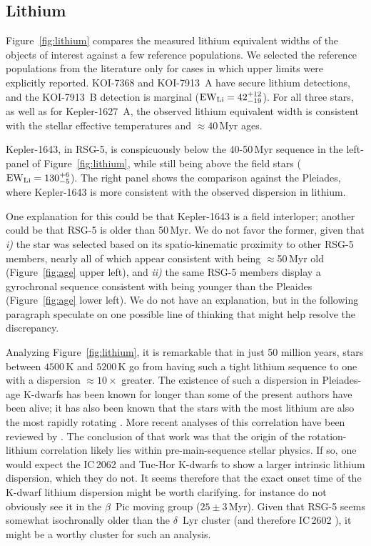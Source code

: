 \documentclass[12pt,twocolumn,linenumbers]{aastex63}
\begin{document}
\subsection{Lithium}

Figure~\ref{fig:lithium} compares the measured lithium equivalent
widths of the objects of interest against a few reference populations.
We selected the reference populations from the literature only for
cases in which upper limits were explicitly reported.  KOI-7368 and
KOI-7913~A have secure lithium detections, and the KOI-7913~B
detection is marginal (${\rm EW}_{\rm Li} = 42^{+12}_{-19}$).  For all
three stars, as well as for Kepler-1627~A, the observed lithium
equivalent width is consistent with the stellar effective temperatures
and $\approx40$\,Myr ages.

Kepler-1643, in RSG-5, is conspicuously below the 40-50$\,$Myr sequence
in the left-panel of Figure~\ref{fig:lithium}, while still being above
the field stars (${\rm EW}_{\rm Li} = 130^{+6}_{-5}$).
The right panel shows the comparison against the Pleiades, where
Kepler-1643 is more consistent with the observed dispersion in lithium.

One explanation for this could be that Kepler-1643 is a field
interloper; another could be that RSG-5 is older than 50\,Myr.  We do
not favor the former, given that {\it i)} the star was selected based
on its spatio-kinematic proximity to other RSG-5 members, nearly all
of which appear consistent with being $\approx$50\,Myr old
(Figure~\ref{fig:age} upper left), and {\it ii)} the same RSG-5
members display a gyrochronal sequence consistent with being younger
than the Pleaides (Figure~\ref{fig:age} lower left).
We do not have an explanation, but in the following paragraph
speculate on one possible line of thinking that might help resolve the
discrepancy.

Analyzing Figure~\ref{fig:lithium}, it is remarkable that in just 50
million years, stars between $4500$\,K and $5200$\,K go from having
such a tight lithium sequence to one with a dispersion
$\approx10\times$ greater.  The existence of such a dispersion in
Pleiades-age K-dwarfs has been known for longer than some of the
present authors have been alive; it has also been known that the stars
with the most lithium are also the most rapidly rotating
\citep{butler_pleiades_1987,soderblom_evolution_1993}.  More recent
analyses of this correlation have been reviewed by
\citet{bouvier_lithium-rotation_2020}.  The conclusion of that work
was that the origin of the rotation-lithium correlation likely lies
within pre-main-sequence stellar physics.  If so, one would expect the
IC\,2062 and Tuc-Hor K-dwarfs to show a larger intrinsic lithium
dispersion, which they do not.  It seems therefore that the exact
onset time of the K-dwarf lithium dispersion might be worth
clarifying.  \citet{messina_rotation-lithium_2016} for instance do not
obviously see it in the $\beta$~Pic moving group ($25\pm3$\,Myr).
Given that RSG-5 seems somewhat isochronally older than the
$\delta$~Lyr cluster (and therefore IC\,2602
\citealt{bouma_kep1627_2022}), it might be a worthy cluster for such
an analysis.
\end{document}

